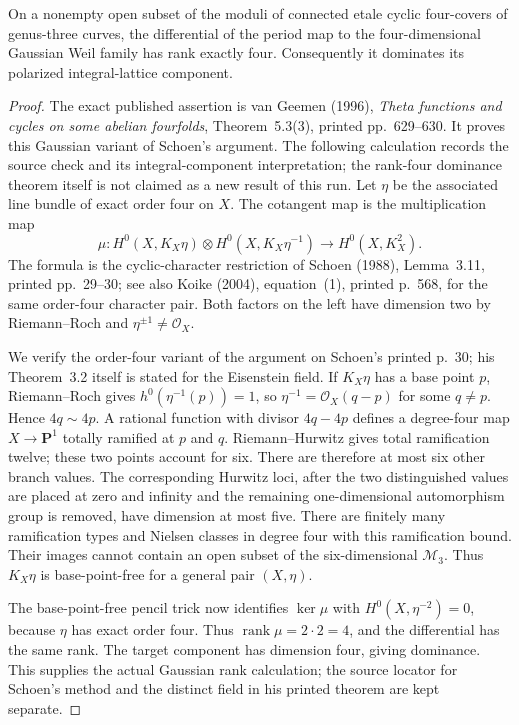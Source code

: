 \begin{proposition}
\label{HD-G02}
On a nonempty open subset of the moduli of connected etale cyclic
four-covers of genus-three curves, the differential of the period map
to the four-dimensional Gaussian Weil family has rank exactly four.
Consequently it dominates its polarized integral-lattice component.
\end{proposition}
\begin{proof}
The exact published assertion is van Geemen (1996),
\emph{Theta functions and cycles on some abelian fourfolds},
Theorem~5.3(3), printed pp.~629--630. It proves this Gaussian variant
of Schoen's argument. The following calculation records the source
check and its integral-component interpretation; the rank-four
dominance theorem itself is not claimed as a new result of this run.
Let $\eta$ be the associated line bundle of exact order four on $X$.
The cotangent map is the multiplication map
\[
 \mu:H^0(X,K_X\eta)\otimes H^0(X,K_X\eta^{-1})
       \longrightarrow H^0(X,K_X^2).
\]
The formula is the cyclic-character restriction of Schoen (1988),
Lemma~3.11, printed pp.~29--30; see also Koike (2004), equation~(1),
printed p.~568, for the same order-four character pair.
Both factors on the left have dimension two by Riemann--Roch and
$\eta^{\pm1}\ne\mathcal O_X$.

We verify the order-four variant of the argument on Schoen's printed
p.~30; his Theorem~3.2 itself is stated for the Eisenstein field.
If $K_X\eta$ has a base point $p$, Riemann--Roch gives
$h^0(\eta^{-1}(p))=1$, so $\eta^{-1}=\mathcal O_X(q-p)$ for some
$q\ne p$. Hence $4q\sim4p$. A rational function with divisor
$4q-4p$ defines a degree-four map $X\to\mathbf P^1$ totally ramified
at $p$ and $q$. Riemann--Hurwitz gives total ramification twelve;
these two points account for six. There are therefore at most six
other branch values. The corresponding Hurwitz loci, after the two
distinguished values are placed at zero and infinity and the remaining
one-dimensional automorphism group is removed, have dimension at
most five. There are finitely many ramification types and Nielsen
classes in degree four with this ramification bound. Their images
cannot contain an open subset of the six-dimensional $\mathcal M_3$.
Thus $K_X\eta$ is base-point-free for a general pair $(X,\eta)$.

The base-point-free pencil trick now identifies $\ker\mu$ with
$H^0(X,\eta^{-2})=0$, because $\eta$ has exact order four.
Thus $\operatorname{rank}\mu=2\cdot2=4$, and the differential has the
same rank. The target component has dimension four, giving dominance.
This supplies the actual Gaussian rank calculation; the source locator
for Schoen's method and the distinct field in his printed theorem are
kept separate.
\end{proof}

